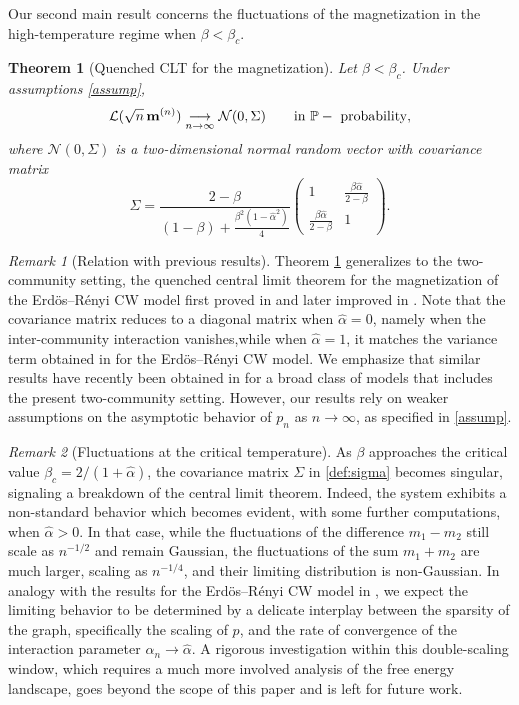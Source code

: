 \documentclass[11pt,oneside]{amsart}
\numberwithin{equation}{section}  %
\theoremstyle{plain}
\newtheorem{theorem}{Theorem}
\theoremstyle{remark}
\newtheorem{remark}{Remark}
\def \bm {{\bf m}}
\begin{document}
Our second main result concerns the fluctuations of the magnetization in the high-temperature regime when $\beta < \beta_c$. 
%
\begin{theorem}[Quenched CLT for the magnetization]
\label{thm:CLT}
Let $\beta < \beta_c$. Under assumptions \eqref{assump}, 
$$
\mathcal{L}(\sqrt{n} \,\bm^{(n)}) \underset{n\to\infty}{\longrightarrow} \mathcal{N}(0, \Sigma) \qquad \text{in } \mathbb{P}-\text{ probability},
$$
where $\mathcal{N}(0, \Sigma)$ is a two-dimensional normal random vector with covariance matrix
\begin{equation}
\label{def:sigma}
\Sigma = \frac{2-\beta}{(1-\beta) + \frac{\beta^2(1-\hat\alpha^2)}{4}} 
\begin{pmatrix} 
1 & \frac{\beta\hat\alpha}{2-\beta} \\
\frac{\beta\hat\alpha}{2-\beta} & 1
\end{pmatrix}.
\end{equation}
\end{theorem}
%
\begin{remark}[Relation with previous results]
Theorem \ref{thm:CLT} generalizes to the two-community setting, the quenched central limit theorem for the magnetization of the Erd\"{o}s--R\'enyi CW model first proved in \cite{KLS19} and later improved in \cite{KLS20}.  
Note that the covariance matrix reduces to a diagonal matrix when $\hat\alpha = 0$, namely when the inter-community interaction vanishes,while when $\hat\alpha = 1$, it matches the variance term obtained in \cite{KLS20} for the Erd\"{o}s--R\'enyi CW model. 
We emphasize that similar results have recently been obtained in \cite{DM23} for a broad class of models that includes the present two-community setting. However, our results rely on weaker assumptions on the asymptotic behavior of $p_n$ as $n \to \infty$, as specified in \eqref{assump}.
\end{remark}

\begin{remark}[Fluctuations at the critical temperature]
As $\beta$ approaches the critical value $\beta_c = 2/(1+\hat{\alpha})$, the covariance matrix $\Sigma$ in \eqref{def:sigma} becomes singular, signaling a breakdown of the central limit theorem. Indeed, the system exhibits a non-standard behavior which becomes evident, with some further computations, when $\hat\alpha >0$. In that case, while the fluctuations of the difference $m_1 - m_2$ still scale as $n^{-1/2}$ and remain Gaussian, the fluctuations of the sum $m_1 + m_2$ are much larger, scaling as $n^{-1/4}$, and their limiting distribution is non-Gaussian. In analogy with the results for the Erd\"{o}s--R\'enyi CW model in \cite{KLS20}, we expect the limiting behavior to be determined by a delicate interplay between the sparsity of the graph, specifically the scaling of $p$, and the rate of convergence of the interaction parameter $\alpha_n \to \hat{\alpha}$. A rigorous investigation within this double-scaling window, which requires a much more involved analysis of the free energy landscape, goes beyond the scope of this paper and is left for future work.
\end{remark}
\end{document}
